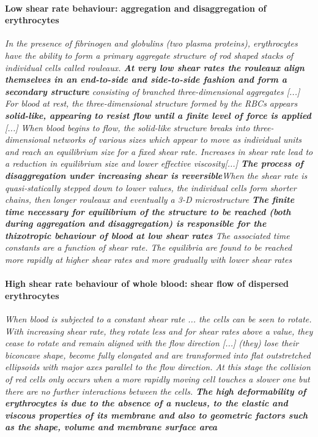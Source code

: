 \documentclass[11pt,letterpaper]{article}
\begin{document}
\paragraph{Low shear rate behaviour: aggregation and disaggregation of erythrocytes} \textit{In the presence of fibrinogen and globulins (two plasma proteins), erythrocytes have the ability to form a primary aggregate structure of rod shaped stacks of individual cells called rouleaux. \textbf{At very low shear rates the rouleaux align themselves in an end-to-side and side-to-side fashion and form a secondary structure} consisting of branched three-dimensional aggregates [...] For blood at rest, the three-dimensional structure formed by the RBCs
appears \textbf{solid-like, appearing to resist flow until a finite level of force is applied} [...] \newline When blood begins to flow, the solid-like structure breaks into three-dimensional networks of various sizes which appear to move as individual units and reach an equilibrium size for a fixed shear rate. Increases in shear rate lead to a reduction in equilibrium size and lower effective viscosity[...] \newline \newline 
\textbf{The process of disaggregation under increasing shear is reversible}When the shear rate is quasi-statically stepped down to lower values, the individual cells form shorter chains, then longer rouleaux and eventually a 3-D microstructure \newline \newline 
{\color{blue}\textbf{The finite time necessary for equilibrium of the structure to be reached (both during aggregation and disaggregation) is responsible for the thixotropic behaviour of blood at low shear rates} \newline The associated time constants are a function of shear rate. The equilibria are found to be reached more rapidly at higher shear rates and more gradually with lower shear rates}}

\paragraph{High shear rate behaviour of whole blood: shear flow of dispersed erythrocytes}\textit{When blood is subjected to a constant shear rate ... the cells can be seen to rotate. With increasing shear rate, they rotate less and for shear rates above a value, they cease to rotate and remain aligned with the flow direction [...] (they) lose their biconcave shape, become fully elongated and are transformed into flat outstretched ellipsoids with major axes parallel to the flow direction. At this stage the collision of red cells only occurs when a more rapidly moving cell touches a slower one but there are no further interactions between the cells. \newline \newline 
{\color{blue}\textbf{The high deformability of erythrocytes is due to the absence of a nucleus, to the elastic and viscous properties of its membrane and also to geometric factors such as the shape, volume and membrane surface area}}}
\end{document}
